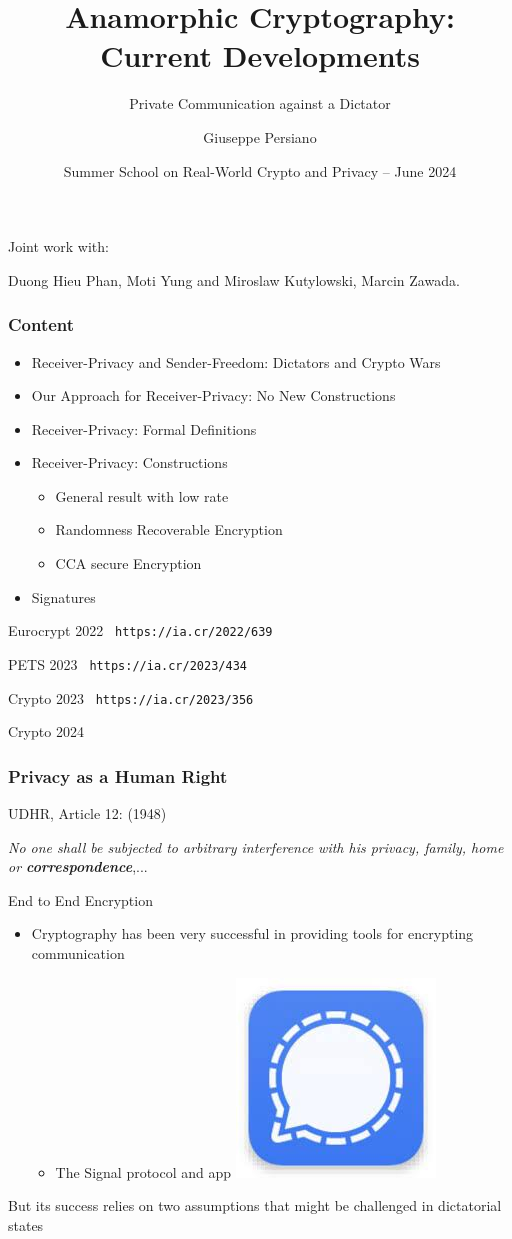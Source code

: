 \documentclass[]{beamer}
\title[Anamorphic]{Anamorphic Cryptography: Current Developments}
\subtitle{Private Communication against a Dictator}
\author{Giuseppe Persiano}
\date{Summer School on Real-World Crypto and Privacy -- June 2024}
\begin{document}
\begin{frame}
  \titlepage



Joint work with:

{Duong Hieu Phan, Moti Yung}
and
Miroslaw Kutylowski, Marcin Zawada. 

\end{frame}


\begin{frame}

\frametitle{Content}

\begin{itemize}
\item Receiver-Privacy and Sender-Freedom: Dictators and Crypto Wars
\item Our Approach for Receiver-Privacy: No New Constructions
\item Receiver-Privacy: Formal Definitions 
\item Receiver-Privacy: Constructions
    \begin{itemize}
        \item General result with low rate
        \item Randomness Recoverable Encryption
        \item CCA secure Encryption
    \end{itemize}
\item Signatures
\end{itemize}

\vfill
\color{brown}
Eurocrypt 2022
{\tt\color{blue}  https://ia.cr/2022/639}

PETS 2023
{\tt\color{blue}  https://ia.cr/2023/434}

Crypto 2023
{\tt\color{blue}  https://ia.cr/2023/356}

Crypto 2024

\end{frame}



\begin{frame}
\frametitle{Privacy as a Human Right}

UDHR, Article 12: (1948)

{\color{brown}
{\em No one shall be subjected to arbitrary interference with his privacy, family, home or \bf correspondence},...
}

\pause
\vskip 1cm
\begin{block}{End to End Encryption}
\begin{itemize}
\item Cryptography has been very successful in providing tools for
encrypting communication
\begin{itemize}
\item The Signal protocol and app \hfill \includegraphics[width=.5cm]{imgs/signal}
\end{itemize}
\end{itemize}
\end{block}

\pause
\vfill
But its success relies on two assumptions that might be challenged in dictatorial
states
\end{frame}
\end{document}
